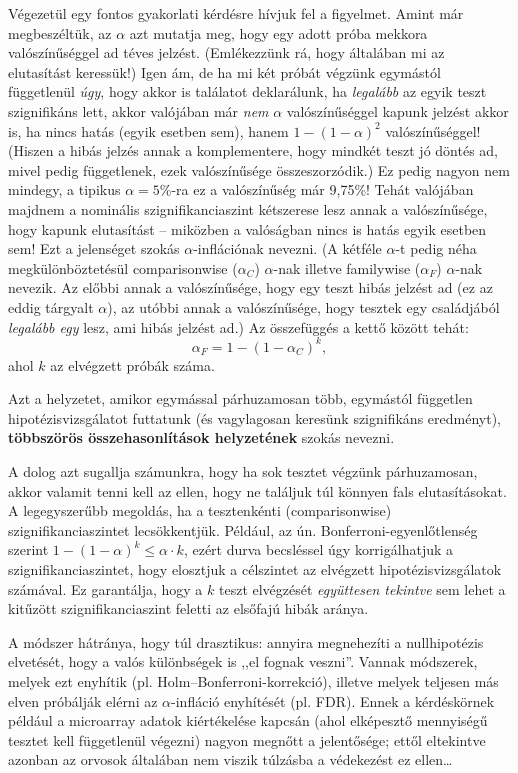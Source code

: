\documentclass[]{book}
\begin{document}
Végezetül egy fontos gyakorlati kérdésre hívjuk fel a figyelmet. Amint
már megbeszéltük, az \(\alpha\) azt mutatja meg, hogy egy adott próba
mekkora valószínűséggel ad téves jelzést. (Emlékezzünk rá, hogy
általában mi az elutasítást keressük!) Igen ám, de ha mi két próbát
végzünk egymástól függetlenül \emph{úgy}, hogy akkor is találatot
deklarálunk, ha \emph{legalább} az egyik teszt szignifikáns lett, akkor
valójában már \emph{nem} \(\alpha\) valószínűséggel kapunk jelzést akkor
is, ha nincs hatás (egyik esetben sem), hanem
\(1-\left(1-\alpha\right)^2\) valószínűséggel! (Hiszen a hibás jelzés
annak a komplementere, hogy mindkét teszt jó döntés ad, mivel pedig
függetlenek, ezek valószínűsége összeszorzódik.) Ez pedig nagyon nem
mindegy, a tipikus \(\alpha=5\)\%-ra ez a valószínűség már 9,75\%! Tehát
valójában majdnem a nominális szignifikanciaszint kétszerese lesz annak
a valószínűsége, hogy kapunk elutasítást -- miközben a valóságban nincs
is hatás egyik esetben sem! Ezt a jelenséget szokás
\(\alpha\)-inflációnak nevezni. (A kétféle \(\alpha\)-t pedig néha
megkülönböztetésül comparisonwise (\(\alpha_C\)) \(\alpha\)-nak illetve
familywise (\(\alpha_F\)) \(\alpha\)-nak nevezik. Az előbbi annak a
valószínűsége, hogy egy teszt hibás jelzést ad (ez az eddig tárgyalt
\(\alpha\)), az utóbbi annak a valószínűsége, hogy tesztek egy
családjából \emph{legalább egy} lesz, ami hibás jelzést ad.) Az
összefüggés a kettő között tehát: \[
    \alpha_F = 1-\left(1-\alpha_C\right)^k,
\] ahol \(k\) az elvégzett próbák száma.

Azt a helyzetet, amikor egymással párhuzamosan több, egymástól független
hipotézisvizsgálatot futtatunk (és vagylagosan keresünk szignifikáns
eredményt), \textbf{többszörös összehasonlítások helyzetének} szokás
nevezni.

A dolog azt sugallja számunkra, hogy ha sok tesztet végzünk
párhuzamosan, akkor valamit tenni kell az ellen, hogy ne találjuk túl
könnyen fals elutasításokat. A legegyszerűbb megoldás, ha a tesztenkénti
(comparisonwise) szignifikanciaszintet lecsökkentjük. Például, az ún.
Bonferroni-egyenlőtlenség szerint
\(1-\left(1-\alpha\right)^k\leq \alpha\cdot k\), ezért durva becsléssel
úgy korrigálhatjuk a szignifikanciaszintet, hogy elosztjuk a célszintet
az elvégzett hipotézisvizsgálatok számával. Ez garantálja, hogy a \(k\)
teszt elvégzését \emph{együttesen tekintve} sem lehet a kitűzött
szignifikanciaszint feletti az elsőfajú hibák aránya.

A módszer hátránya, hogy túl drasztikus: annyira megnehezíti a
nullhipotézis elvetését, hogy a valós különbségek is ,,el fognak
veszni''. Vannak módszerek, melyek ezt enyhítik (pl.
Holm--Bonferroni-korrekció), illetve melyek teljesen más elven próbálják
elérni az \(\alpha\)-infláció enyhítését (pl. FDR). Ennek a kérdéskörnek
például a microarray adatok kiértékelése kapcsán (ahol elképesztő
mennyiségű tesztet kell függetlenül végezni) nagyon megnőtt a
jelentősége; ettől eltekintve azonban az orvosok általában nem viszik
túlzásba a védekezést ez ellen\dots{}
\end{document}
